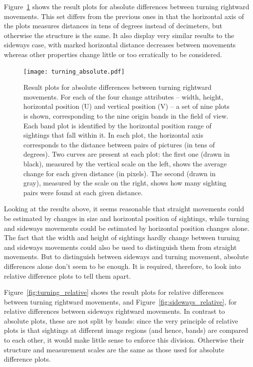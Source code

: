 \documentclass[twocolumn, 9pt]{jsproceedings}
\begin{document}
Figure~\ref{fig:turning_absolute} shows the result plots for absolute differences between turning rightward movements. This set differs from the previous ones in that the horizontal axis of the plots measures distances in tens of degrees instead of decimeters, but otherwise the structure is the same. It also display very similar results to the sideways case, with marked horizontal distance decreases between movements whereas other properties change little or too erratically to be considered.

\begin{figure}[h!]
\texttt{[image: turning\_absolute.pdf]}
\caption{Result plots for absolute differences between turning rightward movements. For each of the four change attributes -- width, height, horizontal position (U) and vertical position (V) -- a set of nine plots is shown, corresponding to the nine origin bands in the field of view. Each band plot is identified by the horizontal position range of sightings that fall within it. In each plot, the horizontal axis corresponds to the distance between pairs of pictures (in tens of degrees). Two curves are present at each plot: the first one (drawn in black), measured by the vertical scale on the left, shows the average change for each given distance (in pixels). The second (drawn in gray), measured by the scale on the right, shows how many sighting pairs were found at each given distance.}
\label{fig:turning_absolute}
\end{figure}

Looking at the results above, it seems reasonable that straight movements could be estimated by changes in size and horizontal position of sightings, while turning and sideways movements could be estimated by horizontal position changes alone. The fact that the width and height of sightings hardly change between turning and sideways movements could also be used to distinguish them from straight movements. But to distinguish between sideways and turning movement, absolute differences alone don't seem to be enough. It is required, therefore, to look into relative difference plots to tell them apart.

Figure~\ref{fig:turning_relative} shows the result plots for relative differences between turning rightward movements, and Figure~\ref{fig:sideways_relative}, for relative differences between sideways rightward movements. In contrast to absolute plots, these are not split by bands: since the very principle of relative plots is that sightings at different image regions (and hence, bands) are compared to each other, it would make little sense to enforce this division. Otherwise their structure and measurement scales are the same as those used for absolute difference plots.
\end{document}
